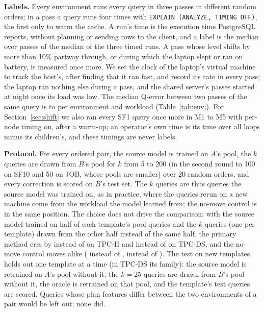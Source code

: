 \documentclass[conference]{IEEEtran}
\begin{document}
\textbf{Labels.} Every environment runs every query in three passes in
different random orders; in a pass a query runs four times with
\texttt{EXPLAIN (ANALYZE, TIMING OFF)}, the first only to warm the cache. A
run's time is the execution time PostgreSQL reports, without planning or
sending rows to the client, and a label is the median over passes of the
median of the three timed runs. A pass whose level shifts by more than 10\%
partway through, or during which the laptop slept or ran on battery, is
measured once more. We set the clock of the laptop's virtual machine to
track the host's, after finding that it ran fast, and record its rate in
every pass; the laptop ran nothing else during a pass, and the shared
server's passes started at night once its load was low. The median Q-error between two passes of the same query
is \EnvNoiseMedQMin{} to \EnvNoiseMedQMax{} per environment and workload
(Table~\ref{tab:env}). For
Section~\ref{sec:shift} we also ran every SF1 query once more in M1 to M5
with per-node timing on, after a warm-up; an operator's own time is its time
over all loops minus its children's, and these timings are never labels.

\textbf{Protocol.} For every ordered pair, the source model is trained on
$A$'s pool, the $k$ queries are drawn from $B$'s pool for $k$ from 5 to 200
(in the second round to 100 on SF10 and 50 on JOB, whose pools are smaller)
over 20 random orders, and every correction is scored on $B$'s test set.
The $k$ queries are thus queries the source model was trained on, as in
practice, where the queries rerun on a new machine come from the workload
the model learned from; the no-move control is in the same position. The
choice does not drive the comparison: with the source model trained on half
of each template's pool queries and the $k$ queries (one per template)
drawn from the other half instead of the same half, the primary method errs
by \XhoTpchOutPrimary{} instead of \XhoTpchInPrimary{} on TPC-H and
\XhoTpcdsOutPrimary{} instead of \XhoTpcdsInPrimary{} on TPC-DS, and the
no-move control moves alike (\XhoTpchOutControl{} instead of
\XhoTpchInControl, \XhoTpcdsOutControl{} instead of \XhoTpcdsInControl). The
test on new templates holds out one template at a time (in TPC-DS its
family): the source model is retrained on $A$'s pool without it, the $k=25$
queries are drawn from $B$'s pool without it, the oracle is retrained on
that pool, and the template's test queries are scored. Queries whose plan
features differ between the two environments of a pair would be left out;
none did.
\end{document}
